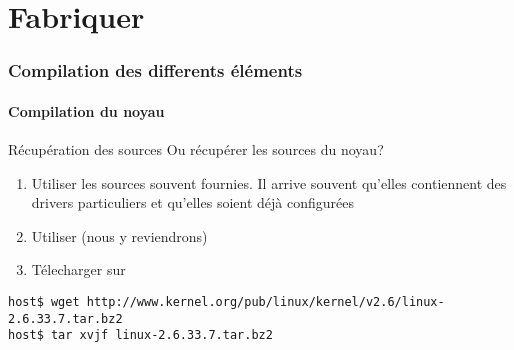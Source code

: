 %
%

\part{Fabriquer}

\begin{frame}
  \partpage
\end{frame}

\begin{frame}
  \tableofcontents
\end{frame}

\section{Compilation des differents éléments}

\subsection{Compilation du noyau}

\begin{frame}[fragile=singleslide]{Récupération des sources}
  Ou récupérer les sources du noyau?
  \begin{enumerate}
  \item Utiliser  les sources souvent fournies.  Il arrive souvent
    qu'elles  contiennent  des  drivers particuliers  et  qu'elles
    soient déjà configurées
  \item Utiliser  (nous y reviendrons)
  \item Télecharger sur 
  \end{enumerate}
  \begin{lstlisting}
host$ wget http://www.kernel.org/pub/linux/kernel/v2.6/linux-2.6.33.7.tar.bz2
host$ tar xvjf linux-2.6.33.7.tar.bz2
  \end{lstlisting}
\end{frame}

